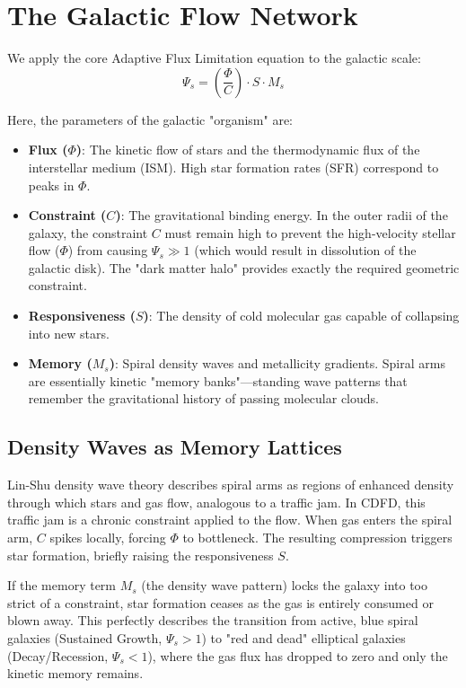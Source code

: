 \documentclass[11pt,a4paper]{article}
\begin{document}
\section{The Galactic Flow Network}
We apply the core Adaptive Flux Limitation equation to the galactic scale:
\begin{equation}
    \Psi_s = \left( \frac{\Phi}{C} \right) \cdot S \cdot M_s
\end{equation}

Here, the parameters of the galactic "organism" are:
\begin{itemize}
    \item \textbf{Flux ($\Phi$)}: The kinetic flow of stars and the thermodynamic flux of the interstellar medium (ISM). High star formation rates (SFR) correspond to peaks in $\Phi$.
    \item \textbf{Constraint ($C$)}: The gravitational binding energy. In the outer radii of the galaxy, the constraint $C$ must remain high to prevent the high-velocity stellar flow ($\Phi$) from causing $\Psi_s \gg 1$ (which would result in dissolution of the galactic disk). The "dark matter halo" provides exactly the required geometric constraint.
    \item \textbf{Responsiveness ($S$)}: The density of cold molecular gas capable of collapsing into new stars.
    \item \textbf{Memory ($M_s$)}: Spiral density waves and metallicity gradients. Spiral arms are essentially kinetic "memory banks"---standing wave patterns that remember the gravitational history of passing molecular clouds.
\end{itemize}

\subsection{Density Waves as Memory Lattices}
Lin-Shu density wave theory describes spiral arms as regions of enhanced density through which stars and gas flow, analogous to a traffic jam. In CDFD, this traffic jam is a chronic constraint applied to the flow. When gas enters the spiral arm, $C$ spikes locally, forcing $\Phi$ to bottleneck. The resulting compression triggers star formation, briefly raising the responsiveness $S$.

If the memory term $M_s$ (the density wave pattern) locks the galaxy into too strict of a constraint, star formation ceases as the gas is entirely consumed or blown away. This perfectly describes the transition from active, blue spiral galaxies (Sustained Growth, $\Psi_s > 1$) to "red and dead" elliptical galaxies (Decay/Recession, $\Psi_s < 1$), where the gas flux has dropped to zero and only the kinetic memory remains.
\end{document}
